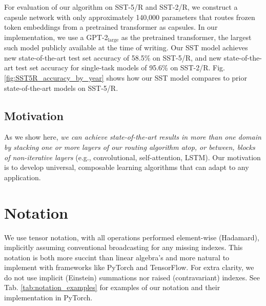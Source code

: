 \documentclass[11pt,a4paper]{article}
\begin{document}
For evaluation of our algorithm on SST-5/R and SST-2/R, we construct a capsule network with only approximately 140,000 parameters that routes frozen token embeddings from a pretrained transformer \cite{DBLP:journals/corr/VaswaniSPUJGKP17} as capsules. In our implementation, we use a GPT-2$_\text{large}$ \cite{GPT-2-Radford-et-al} as the pretrained transformer, the largest such model publicly available at the time of writing. Our SST model achieves new state-of-the-art test set accuracy of 58.5\% on SST-5/R, and new state-of-the-art test set accuracy for single-task models of 95.6\% on SST-2/R. Fig. \ref{fig:SST5R_accuracy_by_year} shows how our SST model compares to prior state-of-the-art models on SST-5/R.

\subsection*{Motivation}

As we show here, {\em we can achieve state-of-the-art results in more than one domain by stacking one or more layers of our routing algorithm atop, or between, blocks of non-iterative layers} (e.g., convolutional, self-attention, LSTM). Our motivation is to develop universal, composable learning algorithms that can adapt to any application.

\section{Notation}\label{sec:notation}

We use tensor notation, with all operations performed element-wise (Hadamard), implicitly assuming conventional broadcasting for any missing indexes. This notation is both more succint than linear algebra's and more natural to implement with frameworks like PyTorch and TensorFlow. For extra clarity, we do not use implicit (Einstein) summations nor raised (contravariant) indexes. See Tab. \ref{tab:notation_examples} for examples of our notation and their implementation in PyTorch.
\end{document}
